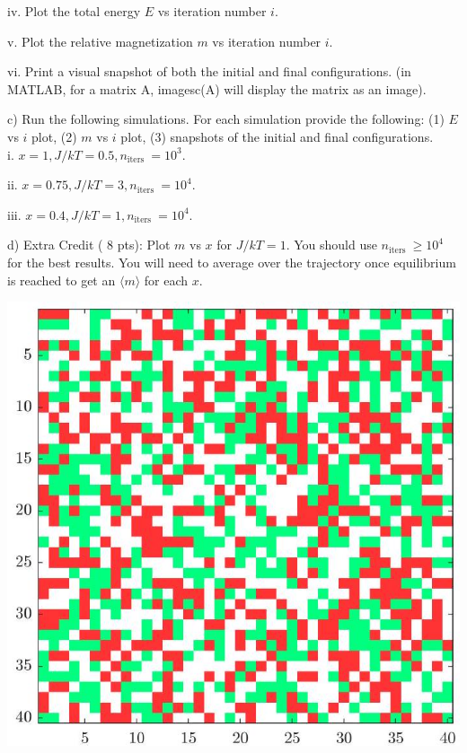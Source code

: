 \documentclass[12pt]{article}
\begin{document}
iv. Plot the total energy $E$ vs iteration number $i$.

v. Plot the relative magnetization $m$ vs iteration number $i$.

vi. Print a visual snapshot of both the initial and final configurations. (in MATLAB, for a matrix $\mathrm{A}$, imagesc(A) will display the matrix as an image).

c) Run the following simulations. For each simulation provide the following: (1) $E$ vs $i$ plot, (2) $m$ vs $i$ plot, (3) snapshots of the initial and final configurations.\\
i. $x=1, J / k T=0.5, n_{\text {iters }}=10^{3}$.

ii. $x=0.75, J / k T=3, n_{\text {iters }}=10^{4}$.

iii. $x=0.4, J / k T=1, n_{\text {iters }}=10^{4}$.

d) Extra Credit ( 8 pts): Plot $m$ vs $x$ for $J / k T=1$. You should use $n_{\text {iters }} \geq 10^{4}$ for the best results. You will need to average over the trajectory once equilibrium is reached to get an $\langle m\rangle$ for each $x$.

\begin{center}
\includegraphics[max width=\textwidth]{2024_03_02_8c82830fbe70d4921a9fg-4(1)}
\end{center}
\end{document}
